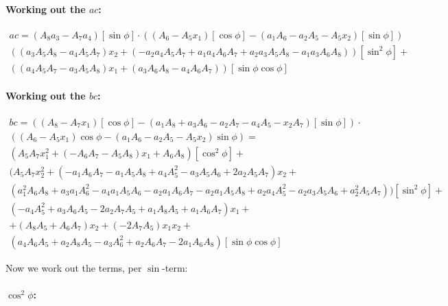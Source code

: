 \documentclass{article}
\begin{document}
\paragraph*{Working out the $ac$:}

\begin{align*}
    ac = (A_8 a_3-A_7a_4 )[\sin \phi] \cdot
    (  (A_6 -  A_5 x_1) [\cos \phi] - (a_1A_6  - a_2A_5 - A_5x_2) [\sin \phi] )  \\
    ( (a_3 A_5 A_8-a_4 A_5 A_7) x_2 + ( - a_2 a_4 A_5 A_7 + a_1 a_4 A_6 A_7 + a_2 a_3 A_5 A_8 - a_1 a_3 A_6 A_8) ) [\sin^2 \phi] + \\
    ((a_4 A_5 A_7 - a_3 A_5 A_8)x_1  + (a_3 A_6 A_8- a_4 A_6 A_7) ) [\sin \phi \cos \phi]
\end{align*}

\paragraph{Working out the $bc$:}

\begin{align*}
     bc = ( (A_8 -  A_7 x_1) [\cos \phi] - 
      (a_1A_8  +   a_3A_6   - a_2A_7 - a_4A_5- x_2A_7) [\sin \phi]) \cdot \\
      (  (A_6 -  A_5 x_1) \cos \phi -
      (a_1A_6  - a_2A_5 - A_5x_2) \sin \phi ) = \\
      (A_5 A_7 x_1^2 + (- A_6 A_7 - A_5 A_8) x_1 + A_6 A_8) [\cos^2 \phi] + \\
      ( A_5 A_7 x_2^2 + (-a_1 A_6 A_7 - a_1 A_5 A_8 + a_4 A_5^2 - a_3 A_5 A_6 + 2 a_2 A_5 A_7)x_2 + \\
      (a_1^2 A_6 A_8 + a_3 a_1 A_6^2 - a_4 a_1 A_5 A_6 - a_2 a_1 A_6 A_7 - a_2 a_1 A_5 A_8 + a_2 a_4 A_5^2 - a_2 a_3 A_5 A_6 + a_2^2 A_5 A_7)) [\sin^2 \phi] + \\
      (-a_4 A_5^2 + a_3 A_6 A_5 - 2 a_2 A_7 A_5 + a_1 A_8 A_5 + a_1 A_6 A_7)x_1 + \\
      + (A_8 A_5+A_6 A_7) x_2 + (-2 A_7 A_5) x_1 x_2 + \\
      (a_4 A_6 A_5 + a_2 A_8 A_5 - a_3 A_6^2 + a_2 A_6 A_7 - 2 a_1 A_6 A_8) [\sin \phi \cos \phi]
\end{align*}


Now we work out the terms, per $\sin$-term:



\paragraph*{$\cos^2 \phi$:}
\end{document}
